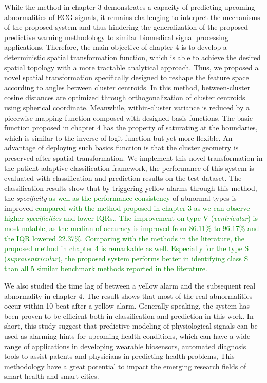 While the method in chapter 3 demonstrates a capacity of predicting upcoming abnormalities of ECG signals, it remains challenging to interpret the mechanisms of the proposed system and thus hindering the generalization of the proposed predictive warning methodology to similar  biomedical signal processing applications. Therefore, the main objective of chapter 4 is to develop a deterministic spatial transformation function, which is able to achieve the desired spatial topology with a more tractable analytical approach. Thus, we proposed a novel spatial transformation specifically designed to reshape the feature space according to angles between cluster centroids. In this method, between-cluster cosine distances are optimized through orthogonalization of cluster centroids using spherical coordinate. Meanwhile, within-cluster variance is reduced by a piecewise mapping function composed with designed basis functions. The basic function proposed in chapter 4 has the property of saturating at the boundaries, which is similar to the inverse of logit function but yet more flexible. An advantage of deploying such basics function is that the cluster geometry is preserved after spatial transformation. 
We implement this novel transformation in the patient-adaptive classification framework, the performance of this system is evaluated with classification and prediction results on the test dataset. The classification results show that by triggering yellow alarms through this method, the \textit{specificity} \textcolor{green}{as well as the performance consistency }of abnormal types is improved   \textcolor{green}{compared with the method proposed in chapter 3 as we can observe higher \textit{specificities} and lower IQRs.. The improvement on type V (\textit{ventricular}) is most notable, as the median of accuracy is improved from 86.11\% to 96.17\% and the IQR lowered 22.37\%.} 
\textcolor{green}{Comparing with the methods in the literature, the proposed method in chapter 4 is remarkable as well. Especially for the type S (\textit{supraventricular}), the proposed system performs better in identifying class S than all 5 similar benchmark methods reported in the literature.}

We also studied the time lag of between a yellow alarm and the subsequent real abnormality in chapter 4. The result shows that most of the real abnormalities occur within 10 beat after a yellow alarm. Generally speaking, the system has been proven to be efficient both in classification and prediction in this work. In short, this study suggest that predictive modeling of physiological signals can be used as alarming hints for upcoming health conditions, which can have a wide range of applications in developing wearable biosensors,  automated diagnosis tools to assist patents and physicians in predicting health problems, This methodology have a great potential to impact the emerging research fields of smart health and smart cities.  


